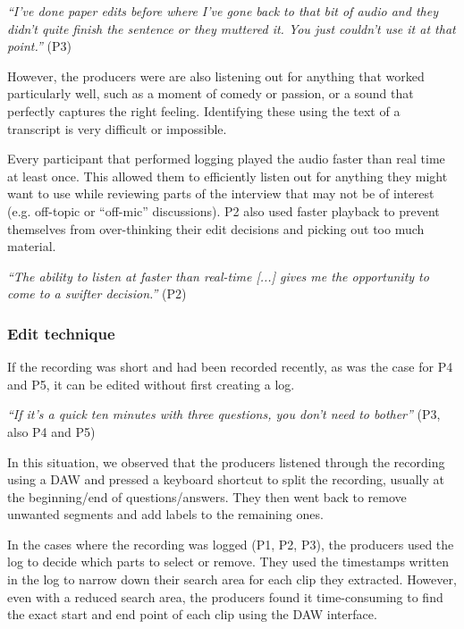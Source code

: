 \textit{``I've done paper edits before where I've gone back to that bit of audio and they didn't quite finish the
  sentence or they muttered it. You just couldn't use it at that point.''} (P3)

However, the producers were are also listening out for anything that worked particularly well, such as a moment of
comedy or passion, or a sound that perfectly captures the right feeling. Identifying these using the text of a
transcript is very difficult or impossible. 

Every participant that performed logging played the audio faster than real time at least once. This allowed them to
efficiently listen out for anything they might want to use while reviewing parts of the interview that may not be of
interest (e.g. off-topic or ``off-mic'' discussions).  P2 also used faster playback to prevent themselves from
over-thinking their edit decisions and picking out too much material.

\textit{``The ability to listen at faster than real-time [...] gives me the opportunity to come to a swifter decision.''}
(P2)


\subsubsection{Edit technique}

If the recording was short and had been recorded recently, as was the case for P4 and P5, it can be edited
without first creating a log.

\textit{``If it's a quick ten minutes with three questions, you don't need to bother''} (P3, also P4 and P5)

In this situation, we observed that the producers listened through the recording using a
DAW and pressed a keyboard shortcut to split the recording, usually at the beginning/end of questions/answers. They
then went back to remove unwanted segments and add labels to the remaining ones.

In the cases where the recording was logged (P1, P2, P3), the producers used the log to decide which parts to select or
remove. They used the timestamps written in the log to narrow down their search area for each clip they extracted.
However, even with a reduced search area, the producers found it time-consuming to find the exact start and end point
of each clip using the DAW interface.

